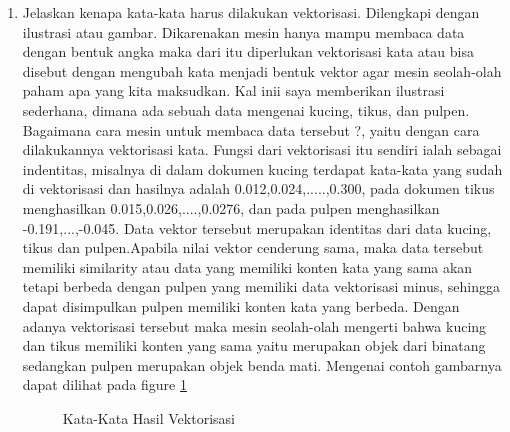 \begin{enumerate}

\item Jelaskan kenapa kata-kata harus dilakukan vektorisasi. Dilengkapi dengan ilustrasi atau gambar.
	\subitem Dikarenakan mesin hanya mampu membaca data dengan bentuk angka maka dari itu diperlukan vektorisasi kata atau bisa disebut dengan mengubah kata menjadi bentuk vektor agar mesin seolah-olah paham apa yang kita maksudkan. Kal inii saya memberikan ilustrasi sederhana, dimana ada sebuah data mengenai kucing, tikus, dan pulpen. Bagaimana cara mesin untuk membaca data tersebut ?, yaitu dengan cara dilakukannya vektorisasi kata. Fungsi dari vektorisasi itu sendiri ialah sebagai indentitas, misalnya di dalam dokumen kucing terdapat kata-kata yang sudah di vektorisasi dan hasilnya adalah 0.012,0.024,.....,0.300, pada dokumen tikus menghasilkan 0.015,0.026,....,0.0276, dan pada pulpen menghasilkan -0.191,...,-0.045. Data vektor tersebut merupakan identitas dari data kucing, tikus dan pulpen.Apabila nilai vektor cenderung sama, maka data tersebut memiliki similarity atau data yang memiliki konten kata yang sama akan tetapi berbeda dengan pulpen yang memiliki data vektorisasi minus, sehingga dapat disimpulkan pulpen memiliki konten kata yang berbeda. Dengan adanya vektorisasi tersebut maka mesin seolah-olah mengerti bahwa kucing dan tikus memiliki konten yang sama yaitu merupakan objek dari binatang sedangkan pulpen merupakan objek benda mati. Mengenai contoh gambarnya dapat dilihat pada figure \ref{YNC5-1}

	\begin{figure}[!htbp]
		\caption{Kata-Kata Hasil Vektorisasi}
		\label{YNC5-1}
	\end{figure}


\end{enumerate}
